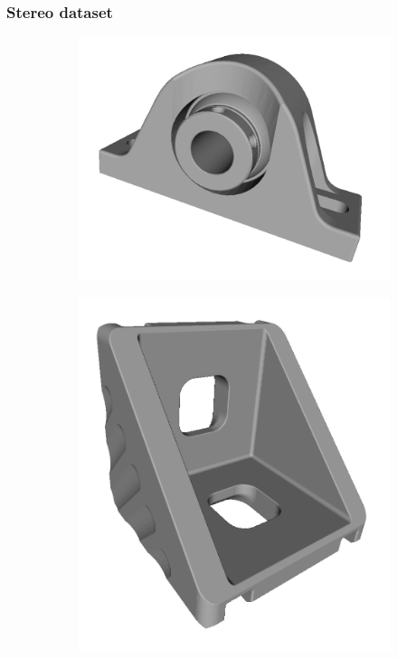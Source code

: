 \subsubsection{Stereo dataset} 

\begin{figure}
	\centering
	\begin{subfigure}[t]{0.23\linewidth} \centering
		\includegraphics[width=1\linewidth]{./fig/eval/toshiba_bearing1.png}
	\end{subfigure}
	\begin{subfigure}[t]{0.23\linewidth} \centering
		\includegraphics[width=0.8\linewidth]{./fig/eval/toshiba_bracket1.png}

\end{subfigure}
\end{figure}

